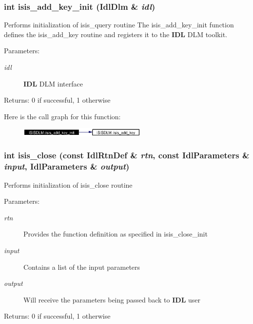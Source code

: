 \subsubsection{\setlength{\rightskip}{0pt plus 5cm}int isis\_\-add\_\-key\_\-init (Idl\-Dlm \& {\em idl})}\label{namespaceISISDLM_a9}


Performs initialization of isis\_\-query routine The isis\_\-add\_\-key\_\-init function defines the isis\_\-add\_\-key routine and registers it to the {\bf IDL} DLM toolkit. \begin{Desc}
\item[Parameters:]
\begin{description}
\item[{\em idl}]{\bf IDL} DLM interface \end{description}
\end{Desc}
\begin{Desc}
\item[Returns:]0 if successful, 1 otherwise \end{Desc}


Here is the call graph for this function:\begin{figure}[H]
\begin{center}
\leavevmode
\includegraphics[width=180pt]{namespaceISISDLM_a9_cgraph}
\end{center}
\end{figure}
\subsubsection{\setlength{\rightskip}{0pt plus 5cm}int isis\_\-close (const Idl\-Rtn\-Def \& {\em rtn}, const Idl\-Parameters \& {\em input}, Idl\-Parameters \& {\em output})}\label{namespaceISISDLM_a12}


Performs initialization of isis\_\-close routine \begin{Desc}
\item[Parameters:]
\begin{description}
\item[{\em rtn}]Provides the function definition as specified in isis\_\-close\_\-init \item[{\em input}]Contains a list of the input parameters \item[{\em output}]Will receive the parameters being passed back to {\bf IDL} user \end{description}
\end{Desc}
\begin{Desc}
\item[Returns:]0 if successful, 1 otherwise \end{Desc}


